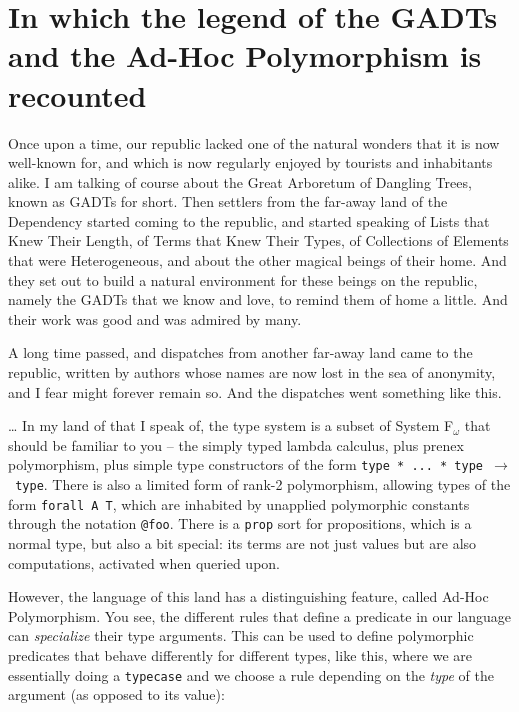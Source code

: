 \section{In which the legend of the GADTs and the Ad-Hoc Polymorphism is
recounted}\label{in-which-the-legend-of-the-gadts-and-the-ad-hoc-polymorphism-is-recounted}

\identNormal\it

Once upon a time, our republic lacked one of the natural wonders that it
is now well-known for, and which is now regularly enjoyed by tourists
and inhabitants alike. I am talking of course about the Great Arboretum
of Dangling Trees, known as GADTs for short. Then settlers from the
far-away land of the Dependency started coming to the republic, and
started speaking of Lists that Knew Their Length, of Terms that Knew
Their Types, of Collections of Elements that were Heterogeneous, and
about the other magical beings of their home. And they set out to build
a natural environment for these beings on the republic, namely the GADTs
that we know and love, to remind them of home a little. And their work
was good and was admired by many.

A long time passed, and dispatches from another far-away land came to
the republic, written by authors whose names are now lost in the sea of
anonymity, and I fear might forever remain so. And the dispatches went
something like this.

\rm

\heroAUTHOR{} \ldots{} In my land of \lamprolog that I speak of, the type
system is a subset of System F\(_\omega\) that should be familiar to you
-- the simply typed lambda calculus, plus prenex polymorphism, plus
simple type constructors of the form
\texttt{type\ *\ ...\ *\ type\ \ensuremath{\to}\ type}. There is also a
limited form of rank-2 polymorphism, allowing types of the form
\texttt{forall\ A\ T}, which are inhabited by unapplied polymorphic
constants through the notation \texttt{@foo}. There is a \texttt{prop}
sort for propositions, which is a normal type, but also a bit special:
its terms are not just values but are also computations, activated when
queried upon.

However, the language of this land has a distinguishing feature, called
Ad-Hoc Polymorphism. You see, the different rules that define a
predicate in our language can \emph{specialize} their type arguments.
This can be used to define polymorphic predicates that behave
differently for different types, like this, where we are essentially
doing a \texttt{typecase} and we choose a rule depending on the
\emph{type} of the argument (as opposed to its value):


